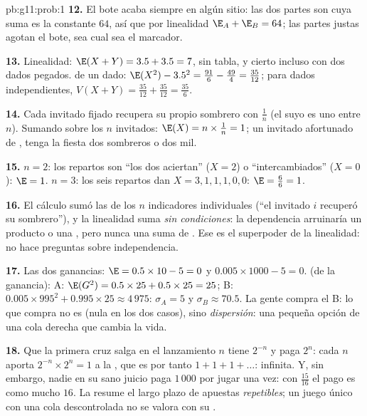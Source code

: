 \begin{solution}{pb:g11:prob:1}
\textbf{12.} El bote acaba siempre en algún sitio: las dos partes son
 cuya suma es la constante $64$, así que por
linealidad $\E_A + \E_B = 64$; las partes justas agotan el bote, sea cual
sea el marcador.

\textbf{13.} Linealidad: $\E(X + Y) = 3.5 + 3.5 = 7$, sin tabla, y cierto
incluso con dos dados pegados.  de un dado:
$\E(X^2) - 3.5^2 = \frac{91}{6} - \frac{49}{4} = \frac{35}{12}$; para
dados independientes,
$V(X + Y) = \frac{35}{12} + \frac{35}{12} = \frac{35}{6}$.

\textbf{14.} Cada invitado fijado recupera su propio sombrero con
 $\frac1n$ (el suyo es uno entre $n$). Sumando sobre los $n$
invitados: $\E(X) = n \times \frac1n = 1$; un invitado afortunado de
, tenga la fiesta dos sombreros o dos mil.

\textbf{15.} $n = 2$: los repartos son ``los dos aciertan'' ($X = 2$) o
``intercambiados'' ($X = 0$): $\E = 1$. $n = 3$: los seis repartos dan
$X = 3, 1, 1, 1, 0, 0$: $\E = \frac{6}{6} = 1$.

\textbf{16.} El cálculo sumó las  de los $n$ indicadores
individuales (``el invitado $i$ recuperó su sombrero''), y la linealidad
suma  \emph{sin condiciones}: la dependencia arruinaría un
producto o una , pero nunca una suma de . Ese es el
superpoder de la linealidad: no hace preguntas sobre independencia.

\textbf{17.} Las dos ganancias: $\E = 0.5 \times 10 - 5 = 0$ y
$0.005 \times 1000 - 5 = 0$.  (de la ganancia): A:
$\E(G^2) = 0.5 \times 25 + 0.5 \times 25 = 25$; B:
$0.005 \times 995^2 + 0.995 \times 25 \approx 4\,975$: $\sigma_A = 5$ y
$\sigma_B \approx 70.5$. La gente compra el B: lo que compra no es
 (nula en los dos casos), sino \emph{dispersión}: una pequeña
opción de una cola derecha que cambia la vida.

\textbf{18.} Que la primera cruz salga en el lanzamiento $n$ tiene
 $2^{-n}$ y paga $2^n$: cada $n$ aporta
$2^{-n} \times 2^n = 1$ a la , que es por tanto
$1 + 1 + 1 + \dots$: infinita. Y, sin embargo, nadie en su sano juicio
paga $1\,000$ por jugar una vez: con  $\frac{15}{16}$ el pago
es como mucho $16$. La  resume el largo plazo de apuestas
\emph{repetibles}; un juego único con una cola descontrolada no se valora
con su .


\end{solution}
